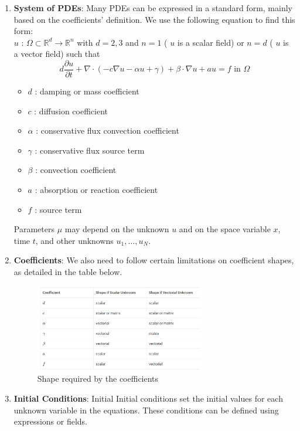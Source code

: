 \documentclass[12pt]{article}
\begin{document}
\begin{enumerate}
\begin{enumerate}
    \item \textbf{System of PDEs}: Many PDEs can be expressed in a standard form, mainly based on the coefficients' definition. We use the following equation to find this form: \\
    \( u \) : \( \Omega \subset \mathbb{R}^d \longrightarrow \mathbb{R}^n \) with \( d = 2, 3 \) and \( n = 1 \) ( \( u \) is a scalar field) or \( n = d \) ( \( u \) is a vector field) such that
    \[
    d \frac{\partial u}{\partial t} + \nabla \cdot \left( -c \nabla u - \alpha u + \gamma \right) + \beta \cdot \nabla u + au = f \text{ in } \Omega
    \]
    \begin{itemize}
        \item \( d \) : damping or mass coefficient
        \item \( c \) : diffusion coefficient
        \item \( \alpha \) : conservative flux convection coefficient
        \item \( \gamma \) : conservative flux source term
        \item \( \beta \) : convection coefficient
        \item \( a \) : absorption or reaction coefficient
        \item \( f \) : source term
    \end{itemize}
    Parameters \( \mu \) may depend on the unknown \( u \) and on the space variable \( x \), time \( t \), and other unknowns \( u_1, \ldots, u_N \).

    \item \textbf{Coefficients}: We also need to follow certain limitations on coefficient shapes, as detailed in the table below.
    \begin{figure}[H]
    \centering
    \includegraphics[width=0.7\textwidth]{images/coeff.png}
    \caption{Shape required by the coefficients}
    \end{figure}
    
    \item \textbf{Initial Conditions}: Initial Initial conditions set the initial values for each unknown variable in the equations. These conditions can be defined using expressions or fields.
    

\end{enumerate}
\end{enumerate}
\end{document}
